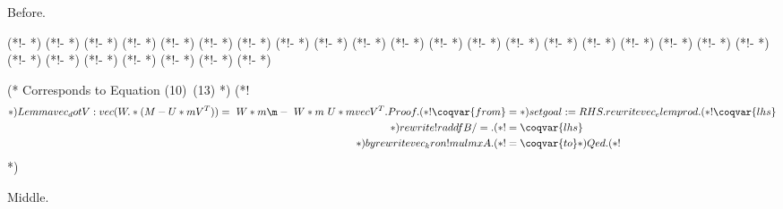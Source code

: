 \documentclass{article}
\begin{document}
Before.

\begin{coq_example}
(*!- \coqadd{\*:}{ } *)
(*!- \coqadd{:\*}{ } *)
(*!-  *)
(*!-  *)
(*!-  *)
(*!-  *)
(*!-  *)
(*!- \coqadd{\.\*}{\odot} *)
(*!-  *)
(*!-  *)
(*!- \coqadd{\\\\d}{\partial} *)
(*!-  *)
(*!-  *)
(*!-  *)
(*!-  *)
(*!- \coqadd{\^\+}{^\dagger} *)
(*!-  *)
(*!- \coqadd{\^-\s*(\w+)}{^{-\1}} *)
(*!-  *)
(*!-  *)
(*!-  *)
(*!-  *)
(*!-  *)
(*!-  *)
(*!-  *)
(*!- \coqadd{\bv\b}{\nu} *)
(*!-  *)

(* Corresponds to Equation (10)~(13) *)
(*! \begin{align} *)
Lemma vec_dot V : vec (W .* (M - U *m V^T)) = ~W *m \m - ~W *m ~U *m vec V^T.
Proof.
  (*! \coqvar{from} &=  *)
  set goal := RHS.
  rewrite vec_elemprod.
  (*! \coqvar{lhs} \\ *)
  rewrite !raddfB /=.
  (*! &= \coqvar{lhs} \\ *)
  by rewrite vec_kron !mulmxA.
  (*! &= \coqvar{to} \label{eq:\coqvar{name}} *)
Qed.
(*! \end{align} *)
\end{coq_example}

Middle.
\end{document}
